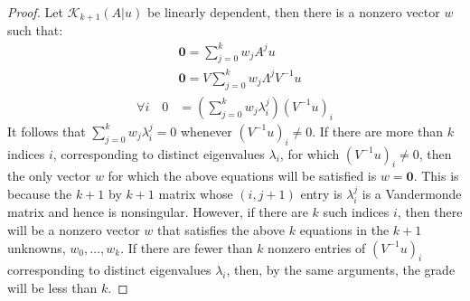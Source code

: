 \documentclass[]{article}
\theoremstyle{definition}
\begin{document}
            \begin{proof}
                Let $\mathcal{K}_{k + 1}(A|u)$ be linearly dependent, then there is a nonzero vector $w$ such that: 
                \begin{align}
                    & \mathbf 0 = \sum_{j = 0}^{k}
                    w_jA^{j}u
                    \\
                    & \mathbf 0 = V\sum_{j = 0}^{k} w_j\Lambda^jV^{-1}u
                    \\
                    \forall i \quad 0 &= \left(
                            \sum_{j = 0}^{k} w_j\lambda_i^{j}
                        \right)(V^{-1}u)_i
                \end{align}
                It follows that $\sum_{j=0}^k w_j \lambda_i^j = 0$ whenever $( V^{-1} u )_i \neq 0$.
                If there are more than $k$ indices $i$, corresponding to distinct eigenvalues $\lambda_i$, for which $( V^{-1} u )_i \neq 0$, then the only vector $w$ for which the above equations will be satisfied is $w = \mathbf{0}$.  This is because the $k+1$ by $k+1$ matrix whose $(i,j+1)$ entry is $\lambda_i^j$ is a Vandermonde matrix and hence is nonsingular. However, if there are $k$ such indices $i$, then there will be a nonzero vector $w$ that satisfies the above $k$ equations in the $k+1$ unknowns, $w_0 , \ldots , w_k$.  If there are fewer than $k$ nonzero entries of $( V^{-1} u )_i$ corresponding to distinct eigenvalues $\lambda_i$, then, by the same arguments, the grade  will be less than $k$. 
            \end{proof}
            
\end{document}

